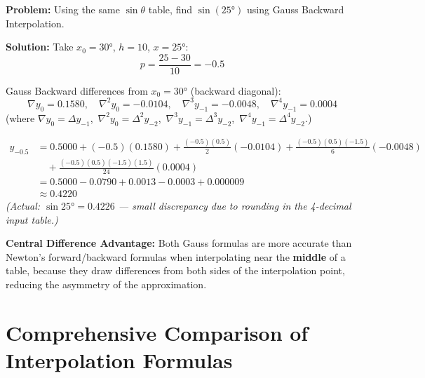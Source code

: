 \documentclass[12pt]{article}
\begin{document}
\bigskip

\begin{examplebox*}
\textbf{Problem:} Using the same $\sin\theta$ table, find $\sin(25°)$ using Gauss Backward Interpolation.

\textbf{Solution:} Take $x_0 = 30°$, $h = 10$, $x = 25°$:
\[
  p = \frac{25 - 30}{10} = -0.5
\]

Gauss Backward differences from $x_0 = 30°$ (backward diagonal):
\[
  \nabla y_0 = 0.1580,\quad \nabla^2 y_0 = -0.0104,\quad \nabla^3 y_{-1} = -0.0048,\quad \nabla^4 y_{-1} = 0.0004
\]
(where $\nabla y_0 = \Delta y_{-1}$,\ $\nabla^2 y_0 = \Delta^2 y_{-2}$,\ $\nabla^3 y_{-1} = \Delta^3 y_{-2}$,\ $\nabla^4 y_{-1} = \Delta^4 y_{-2}$.)

\begin{align*}
y_{-0.5} &= 0.5000 + (-0.5)(0.1580) + \frac{(-0.5)(0.5)}{2}(-0.0104) + \frac{(-0.5)(0.5)(-1.5)}{6}(-0.0048) \\[4pt]
         &\quad + \frac{(-0.5)(0.5)(-1.5)(1.5)}{24}(0.0004) \\[4pt]
         &= 0.5000 - 0.0790 + 0.0013 - 0.0003 + 0.000009 \\[4pt]
         &\approx \boxed{0.4220}
\end{align*}
\textit{(Actual: $\sin 25° = 0.4226$ — small discrepancy due to rounding in the 4-decimal input table.)}
\end{examplebox*}

\bigskip

\begin{keybox}
\textbf{Central Difference Advantage:} Both Gauss formulas are more accurate than Newton's forward/backward formulas when interpolating near the \textbf{middle} of a table, because they draw differences from both sides of the interpolation point, reducing the asymmetry of the approximation.
\end{keybox}

\newpage

\section{Comprehensive Comparison of Interpolation Formulas}
\end{document}
